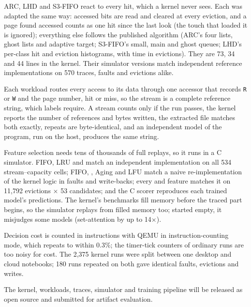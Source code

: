  ARC, LHD and S3-FIFO react to
every hit, which a kernel never sees. Each was adapted the same way: accessed bits are
read and cleared at every eviction, and a page found accessed counts as one hit since the
last look (the touch that loaded it is ignored); everything else follows the published
algorithm (ARC's four lists, ghost lists and adaptive target; S3-FIFO's small, main and
ghost queues; LHD's per-class hit and eviction histograms, with time in evictions). They
are 73, 34 and 44 lines in the kernel. Their simulator versions match independent
reference implementations on 570 traces, faults and evictions alike.

 Each workload routes every access to its data
through one accessor that records \texttt{R} or \texttt{W} and the page number, hit or
miss, so the stream is a complete reference string, which \belady labels require. A
stream counts only if the run passes, the kernel reports the number of references and
bytes written, the extracted file matches both exactly, repeats are byte-identical, and
an independent model of the program, run on the host, produces the same string.

 Feature selection needs tens of thousands of full
replays, so it runs in a C simulator. FIFO, LRU and \belady match an independent
implementation on all 534 stream--capacity cells; FIFO, \clock, Aging and LFU match a
naive re-implementation of the kernel logic in faults and write-backs; every \tierK and
\tierKp feature matches it on 11,792 evictions $\times$ 53 candidates; and the C scorer
reproduces each trained model's predictions. The kernel's benchmarks fill memory before
the traced part begins, so the simulator replays from filled memory too; started empty,
it misjudges some models (set-attention by up to 14$\times$).

 Decision cost is counted in instructions
with QEMU in instruction-counting mode, which repeats to within 0.3\%; the timer-tick
counters of ordinary runs are too noisy for cost. The 2,375 kernel runs were split
between one desktop and cloud notebooks; 180 runs repeated on both gave identical faults,
evictions and writes. 

 The kernel, workloads, traces, simulator and training pipeline
will be released as open source and submitted for artifact evaluation.
